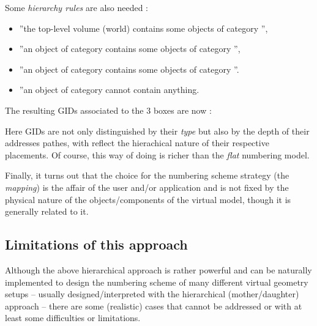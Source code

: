 \begin{itemize}
    \pn Some \emph{hierarchy rules} are also needed :

    \begin{itemize}

    \item  ''the  top-level volume (world)  contains some
    objects of category '',

    \item  ''an object  of category   contains some
    objects of category '',

    \item  ''an object  of category   contains some
    objects of category ''.

    \item  ''an object  of category  cannot contain anything.

    \end{itemize}

    \pn The resulting GIDs associated to the 3 boxes are now :
    
    \begin{center}
      \scalebox{1.0}{}
    \end{center}

    \pn Here GIDs are not  only distinguished by their \emph{type} but
    also  by the  depth of  their addresses  pathes, with  reflect the
    hierachical nature of their respective placements. Of course, this
    way of doing is richer than the \emph{flat} numbering model.
\end{itemize}

\pn Finally,  it turns  out that the  choice for the  numbering scheme
strategy  (the  \emph{mapping})  is  the  affair of  the  user  and/or
application  and  is   not  fixed  by  the  physical   nature  of  the
objects/components  of  the  virtual  model, though  it  is  generally
related to it.

\subsection{Limitations of this approach}

\pn Although  the above hierarchical  approach is rather  powerful and
can be  naturally implemented to  design the numbering scheme  of many
different virtual geometry setups -- usually designed/interpreted with
the  hierarchical   (mother/daughter)  approach  --   there  are  some
(realistic)  cases that  cannot be  addressed  or with  at least  some
difficulties or limitations.

